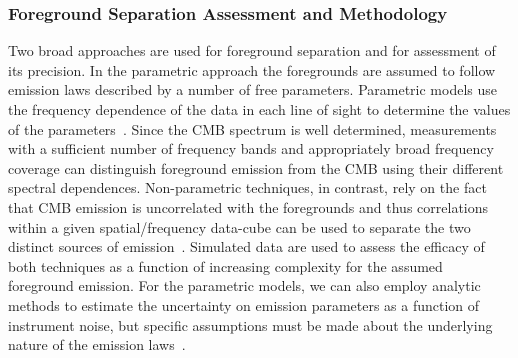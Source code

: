 \documentclass[PICOReport.tex]{subfiles}
\begin{document}
\subsubsection{Foreground Separation Assessment and Methodology}
\label{sec:foreground_separation_methodology}




Two broad approaches are used for foreground separation and for assessment of its precision.  In the parametric approach the foregrounds are assumed to follow emission laws described by a number of free parameters. Parametric models use the frequency dependence of the data in each line of sight to determine the values of the parameters~\citep{eriksen/etal:2008}.  Since the CMB spectrum is well determined, measurements with a sufficient number of frequency bands and appropriately broad frequency coverage can distinguish foreground emission from the CMB using their different spectral dependences. Non-parametric techniques, in contrast, rely on the fact that CMB emission is uncorrelated with the foregrounds and thus correlations within a given spatial/frequency data-cube can be used to separate the two distinct sources of emission~\citep{delabrouille2003,Cardoso2008,Delabrouille2009,nilc,gnilc}.  Simulated data are used to assess the efficacy of both techniques as a function of increasing complexity for the assumed foreground emission. For the parametric models, we can also employ analytic methods to estimate the uncertainty on emission parameters as a function of instrument noise, but specific assumptions must be made about the underlying nature of the emission laws~\citep{errard_and_finney}. 
\end{document}
